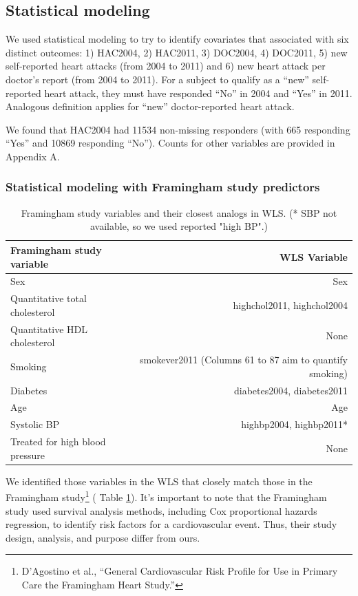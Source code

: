 \documentclass[11pt,]{article}
\let\rmarkdownfootnote\footnote%
\def\footnote{\protect\rmarkdownfootnote}
\begin{document}
\subsection{Statistical modeling}\label{statistical-modeling}

We used statistical modeling to try to identify covariates that
associated with six distinct outcomes: 1) HAC2004, 2) HAC2011, 3)
DOC2004, 4) DOC2011, 5) new self-reported heart attacks (from 2004 to
2011) and 6) new heart attack per doctor's report (from 2004 to 2011).
For a subject to qualify as a ``new'' self-reported heart attack, they
must have responded ``No'' in 2004 and ``Yes'' in 2011. Analogous
definition applies for ``new'' doctor-reported heart attack.

We found that HAC2004 had 11534 non-missing responders (with 665
responding ``Yes'' and 10869 responding ``No''). Counts for other
variables are provided in Appendix A.

\subsubsection{Statistical modeling with Framingham study
predictors}\label{statistical-modeling-with-framingham-study-predictors}


\begin{table}
\begin{tabular}{l r}

Framingham study variable & WLS Variable\\
\hline
Sex & Sex\\
Quantitative total cholesterol & highchol2011, highchol2004\\
Quantitative HDL cholesterol & None\\
Smoking & smokever2011 (Columns 61 to 87 aim to quantify smoking) \\
Diabetes & diabetes2004, diabetes2011\\
Age & Age\\
Systolic BP & highbp2004, highbp2011* \\
Treated for high blood pressure & None\\
\hline
\end{tabular}
\caption{Framingham study variables and their closest analogs in WLS. (* SBP not available, so we used reported "high BP".)}
\label{table:fram2wls} %
\end{table}

We identified those variables in the WLS that closely match those in the
Framingham study\footnote{D'Agostino et al., ``General Cardiovascular
  Risk Profile for Use in Primary Care the Framingham Heart Study.'' } (
Table \ref{table:fram2wls}). It's important to note that the Framingham
study used survival analysis methods, including Cox proportional hazards
regression, to identify risk factors for a cardiovascular event. Thus,
their study design, analysis, and purpose differ from ours.
\end{document}
